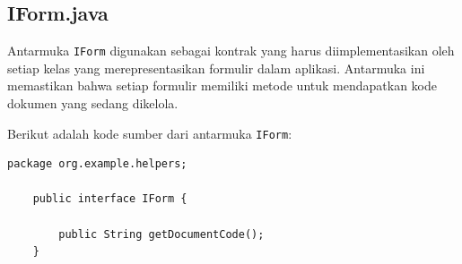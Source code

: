 \subsection{IForm.java}

Antarmuka \texttt{IForm} digunakan sebagai kontrak yang harus diimplementasikan oleh setiap kelas yang merepresentasikan formulir dalam aplikasi. Antarmuka ini memastikan bahwa setiap formulir memiliki metode untuk mendapatkan kode dokumen yang sedang dikelola.

Berikut adalah kode sumber dari antarmuka \texttt{IForm}:

\begin{lstlisting}[style=JavaStyle]
	package org.example.helpers;
	
	public interface IForm {
		
		public String getDocumentCode();
	}
\end{lstlisting}

